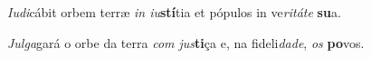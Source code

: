 \begin{greenumerate}
  \switchcolumn*


  \item \textit{Iudi}cábit orbem terræ \textit{in iu}\textbf{stí}tia {\GreStar} et pópulos in ve\textit{ritáte} \textbf{su}a. 

  \switchcolumn%

  \item \textit{Julga}gará o orbe da terra \textit{com jus}\textbf{ti}ça {\GreStar} e, na fideli\textit{dade}, \textit{os} \textbf{po}vos. 
\end{greenumerate}